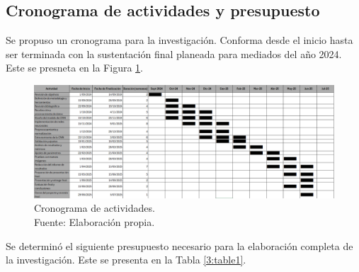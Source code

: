 \begin{landscape}
	\section{Cronograma de actividades y presupuesto}
	Se propuso un cronograma para la investigación. Conforma desde el inicio hasta ser terminada con la sustentación final planeada para mediados del año 2024. Este se presneta en la Figura \ref{3:fig303}.

	\begin{figure}[!ht]
		\begin{center}
			\includegraphics[width=1.50\textwidth]{3/figures/gant.png}
			\caption[Cronograma de actividades]{Cronograma de actividades.\\
				Fuente: Elaboración propia.}
			\label{3:fig303}
		\end{center}
	\end{figure}
	
\end{landscape}





Se determinó el siguiente presupuesto necesario para la elaboración completa de la investigación. Este se presenta en la Tabla \ref{3:table1}.

